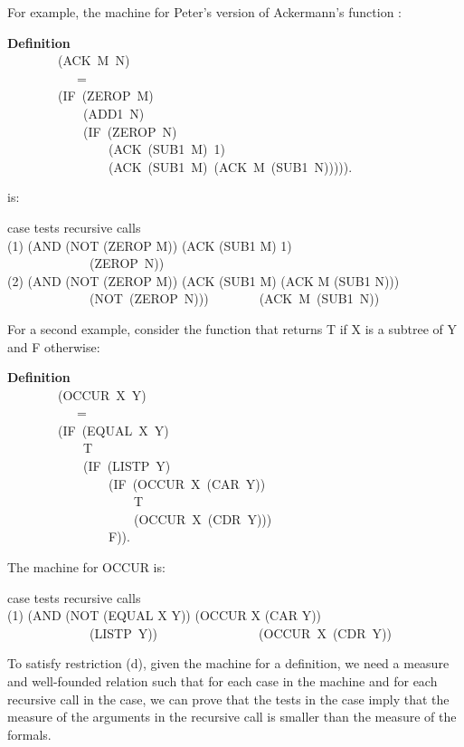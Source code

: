 \documentclass[10pt]{book}
\newenvironment{pubasis}{\begin{flushleft}}{\end{flushleft}}
\newcommand{\axiomordefinition}[1]{\vspace{6pt}\Large\textsf{\textbf{#1}}\normalsize}
\begin{document}
For example, the machine for Peter's version of Ackermann's function \cite{PETER}:
\begin{pubasis}
\axiomordefinition{Definition}\\
~~~~~~~~(ACK~M~N)\\
~~~~~~~~~~~=\\
~~~~~~~~(IF~(ZEROP~M)\\
~~~~~~~~~~~~(ADD1~N)\\
~~~~~~~~~~~~(IF~(ZEROP~N)\\
~~~~~~~~~~~~~~~~(ACK~(SUB1~M)~1)\\
~~~~~~~~~~~~~~~~(ACK~(SUB1~M)~(ACK~M~(SUB1~N))))).\\
\end{pubasis}
is:
\begin{pubasis}
case	   tests		recursive calls\\

(1)	(AND (NOT (ZEROP M))	(ACK (SUB1 M) 1)\\
~~~~~~~~~~~~~(ZEROP~N))\\

(2)	(AND (NOT (ZEROP M))	(ACK (SUB1 M) (ACK M (SUB1 N)))\\
~~~~~~~~~~~~~(NOT~(ZEROP~N)))~~~~~~~~(ACK~M~(SUB1~N))\\
\end{pubasis}
For a second example, consider the function that returns T if X is a
subtree of Y and F otherwise:

\begin{pubasis}
\axiomordefinition{Definition}\\
~~~~~~~~(OCCUR~X~Y)\\
~~~~~~~~~~~=\\
~~~~~~~~(IF~(EQUAL~X~Y)\\
~~~~~~~~~~~~T\\
~~~~~~~~~~~~(IF~(LISTP~Y)\\
~~~~~~~~~~~~~~~~(IF~(OCCUR~X~(CAR~Y))\\
~~~~~~~~~~~~~~~~~~~~T\\
~~~~~~~~~~~~~~~~~~~~(OCCUR~X~(CDR~Y)))\\
~~~~~~~~~~~~~~~~F)).\\
\end{pubasis}
The machine for OCCUR is:
\begin{pubasis}
case	   tests		recursive calls\\

(1)	(AND (NOT (EQUAL X Y))	(OCCUR X (CAR Y))\\
~~~~~~~~~~~~~(LISTP~Y))~~~~~~~~~~~~~~~~(OCCUR~X~(CDR~Y))\\
\end{pubasis}
To satisfy restriction (d), given the machine for a definition,
we need a measure and well-founded
relation such that for each case in the machine and for each recursive call in the case,
we can prove that the tests in the case imply that the measure of
the arguments in the recursive call is smaller than the measure of the
formals.
\end{document}
